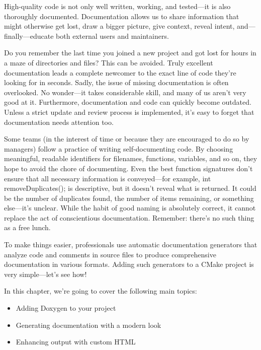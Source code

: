 High-quality code is not only well written, working, and tested—it is also thoroughly documented. Documentation allows us to share information that might otherwise get lost, draw a bigger picture, give context, reveal intent, and—finally—educate both external users and maintainers.

Do you remember the last time you joined a new project and got lost for hours in a maze of directories and files? This can be avoided. Truly excellent documentation leads a complete newcomer to the exact line of code they’re looking for in seconds. Sadly, the issue of missing documentation is often overlooked. No wonder—it takes considerable skill, and many of us aren’t very good at it. Furthermore, documentation and code can quickly become outdated. Unless a strict update and review process is implemented, it’s easy to forget that documentation needs attention too.

Some teams (in the interest of time or because they are encouraged to do so by managers) follow a practice of writing self-documenting code. By choosing meaningful, readable identifiers for filenames, functions, variables, and so on, they hope to avoid the chore of documenting. Even the best function signatures don’t ensure that all necessary information is conveyed—for example, int removeDuplicates(); is descriptive, but it doesn’t reveal what is returned. It could be the number of duplicates found, the number of items remaining, or something else—it’s unclear. While the habit of good naming is absolutely correct, it cannot replace the act of conscientious documentation. Remember: there’s no such thing as a free lunch.

To make things easier, professionals use automatic documentation generators that analyze code and comments in source files to produce comprehensive documentation in various formats. Adding such generators to a CMake project is very simple—let’s see how!

In this chapter, we’re going to cover the following main topics:

\begin{itemize}
\item
Adding Doxygen to your project

\item
Generating documentation with a modern look

\item
Enhancing output with custom HTML
\end{itemize}